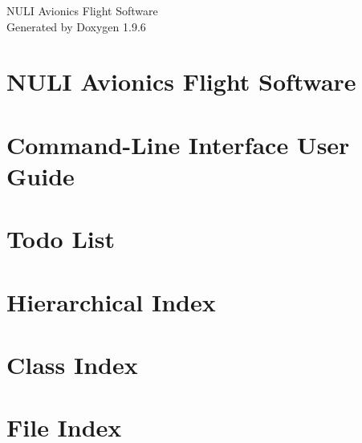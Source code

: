 \documentclass[twoside]{book}
\newcommand{\+}{\discretionary{\mbox{\scriptsize$\hookleftarrow$}}{}{}}
\newcommand{\clearemptydoublepage}{%
    \newpage{\pagestyle{empty}\cleardoublepage}%
  }
\begin{document}
  \raggedbottom
    \hypersetup{pageanchor=false,
                bookmarksnumbered=true,
                pdfencoding=unicode
               }
  \begin{titlepage}
  \vspace*{7cm}
  \begin{center}%
  {\Large NULI Avionics Flight Software}\\
  \vspace*{1cm}
  {\large Generated by Doxygen 1.9.6}\\
  \end{center}
  \end{titlepage}
  \clearemptydoublepage
  \tableofcontents
  \clearemptydoublepage
  \hypersetup{pageanchor=true}
\chapter{NULI Avionics Flight Software}
\label{index}\hypertarget{index}{}
\chapter{Command-\/\+Line Interface User Guide}
\label{md_nuli_avionics_flight_software_platformio_nuli_avionics_flight_software_src_core_cli_README}

\chapter{Todo List}
\label{todo}

\chapter{Hierarchical Index}

\chapter{Class Index}

\chapter{File Index}

\end{document}
